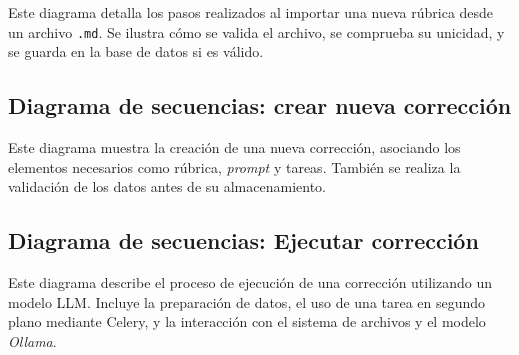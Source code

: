 Este diagrama detalla los pasos realizados al importar una nueva rúbrica desde un archivo \texttt{.md}. Se ilustra cómo se valida el archivo, se comprueba su unicidad, y se guarda en la base de datos si es válido.


\subsection{Diagrama de secuencias: crear nueva corrección}

Este diagrama muestra la creación de una nueva corrección, asociando los elementos necesarios como rúbrica, \textit{prompt} y tareas. También se realiza la validación de los datos antes de su almacenamiento.


\subsection{Diagrama de secuencias: Ejecutar corrección}

Este diagrama describe el proceso de ejecución de una corrección utilizando un modelo LLM. Incluye la preparación de datos, el uso de una tarea en segundo plano mediante Celery, y la interacción con el sistema de archivos y el modelo \textit{Ollama}.

